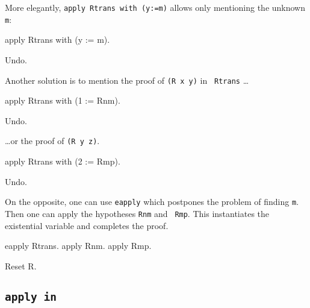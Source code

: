 \begin{coq_example*}
More elegantly, {\tt apply Rtrans with (y:=m)} allows only mentioning
the unknown {\tt m}:

\begin{coq_example*}
apply Rtrans with (y := m).
\end{coq_example*}
\begin{coq_eval}
Undo.
\end{coq_eval}

Another solution is to mention the proof of {\tt (R x y)} in {\tt
Rtrans} \ldots

\begin{coq_example}
apply Rtrans with (1 := Rnm).
\end{coq_example}
\begin{coq_eval}
Undo.
\end{coq_eval}

\ldots or the proof of {\tt (R y z)}.

\begin{coq_example}
apply Rtrans with (2 := Rmp).
\end{coq_example}
\begin{coq_eval}
Undo.
\end{coq_eval}

On the opposite, one can use {\tt eapply} which postpones the problem
of finding {\tt m}. Then one can apply the hypotheses {\tt Rnm} and {\tt
Rmp}. This instantiates the existential variable and completes the proof.

\begin{coq_example}
eapply Rtrans.
apply Rnm.
apply Rmp.
\end{coq_example}

\begin{coq_eval}
Reset R.
\end{coq_eval}

\subsection{\tt apply {\term} in {\ident}}


\end{coq_example*}
